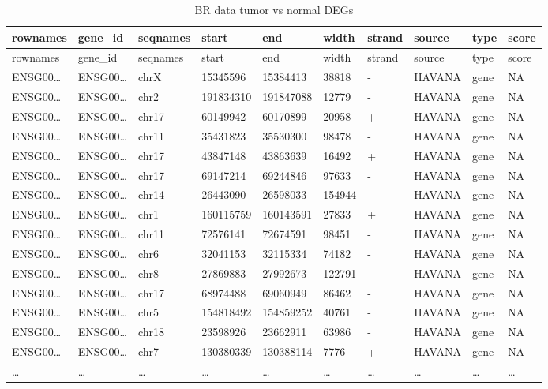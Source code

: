\documentclass[
]{article}
\begin{document}
\begin{longtable}[]{@{}llllllllll@{}}
\caption{\label{tab:BR-data-tumor-vs-normal-DEGs}BR data tumor vs normal DEGs}\tabularnewline
\toprule
rownames & gene\_id & seqnames & start & end & width & strand & source & type & score\tabularnewline
\midrule
\endfirsthead
\toprule
rownames & gene\_id & seqnames & start & end & width & strand & source & type & score\tabularnewline
\midrule
\endhead
ENSG00\ldots{} & ENSG00\ldots{} & chrX & 15345596 & 15384413 & 38818 & - & HAVANA & gene & NA\tabularnewline
ENSG00\ldots{} & ENSG00\ldots{} & chr2 & 191834310 & 191847088 & 12779 & - & HAVANA & gene & NA\tabularnewline
ENSG00\ldots{} & ENSG00\ldots{} & chr17 & 60149942 & 60170899 & 20958 & + & HAVANA & gene & NA\tabularnewline
ENSG00\ldots{} & ENSG00\ldots{} & chr11 & 35431823 & 35530300 & 98478 & - & HAVANA & gene & NA\tabularnewline
ENSG00\ldots{} & ENSG00\ldots{} & chr17 & 43847148 & 43863639 & 16492 & + & HAVANA & gene & NA\tabularnewline
ENSG00\ldots{} & ENSG00\ldots{} & chr17 & 69147214 & 69244846 & 97633 & - & HAVANA & gene & NA\tabularnewline
ENSG00\ldots{} & ENSG00\ldots{} & chr14 & 26443090 & 26598033 & 154944 & - & HAVANA & gene & NA\tabularnewline
ENSG00\ldots{} & ENSG00\ldots{} & chr1 & 160115759 & 160143591 & 27833 & + & HAVANA & gene & NA\tabularnewline
ENSG00\ldots{} & ENSG00\ldots{} & chr11 & 72576141 & 72674591 & 98451 & - & HAVANA & gene & NA\tabularnewline
ENSG00\ldots{} & ENSG00\ldots{} & chr6 & 32041153 & 32115334 & 74182 & - & HAVANA & gene & NA\tabularnewline
ENSG00\ldots{} & ENSG00\ldots{} & chr8 & 27869883 & 27992673 & 122791 & - & HAVANA & gene & NA\tabularnewline
ENSG00\ldots{} & ENSG00\ldots{} & chr17 & 68974488 & 69060949 & 86462 & - & HAVANA & gene & NA\tabularnewline
ENSG00\ldots{} & ENSG00\ldots{} & chr5 & 154818492 & 154859252 & 40761 & - & HAVANA & gene & NA\tabularnewline
ENSG00\ldots{} & ENSG00\ldots{} & chr18 & 23598926 & 23662911 & 63986 & - & HAVANA & gene & NA\tabularnewline
ENSG00\ldots{} & ENSG00\ldots{} & chr7 & 130380339 & 130388114 & 7776 & + & HAVANA & gene & NA\tabularnewline
\ldots{} & \ldots{} & \ldots{} & \ldots{} & \ldots{} & \ldots{} & \ldots{} & \ldots{} & \ldots{} & \ldots{}\tabularnewline
\bottomrule
\end{longtable}

\begin{center}\vspace{1.5cm}\end{center}

\begin{center}\vspace{1.5cm}\end{center}
\end{document}
